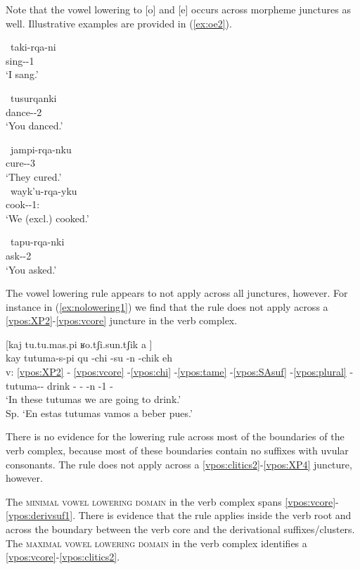 \documentclass[output=paper]{langscibook}
\begin{document}
Note that the vowel lowering to [o] and [e] occurs across morpheme junctures as well. Illustrative examples are provided in (\ref{ex:oe2}).

\ea \label{ex:oe2}
    \ea
    [ta.ker.ʁa.ni] \
    \gll taki-rqa-ni \\
    sing-\Pst{}-1\Sg{} \\
    \glt `I sang.'

     \
    \gll tusurqanki  \\
    dance-\Pst{}-2\Sg{} \\
    \glt `You danced.'
    
     \
    \gll jampi-rqa-nku \\
    cure-\Pst{}-3\Pl{} \\
    \glt `They cured.' \\
     \
    \gll wayk'u-rqa-yku \\
    cook-\Pst{}-1\Pl{}:\Excl{} \\
    \glt `We (excl.) cooked.'
    
    \ex
    [ta.por.ʁaŋ.ki] \
    \gll tapu-rqa-nki \\
    ask-\Pst{}-2\Sg{} \\
    \glt `You asked.'
\z 
\z 

The vowel lowering rule appears to not apply across all junctures, however. For instance in (\ref{ex:nolowering1}) we find that the rule does not apply across a \ref{vpos:XP2}-\ref{vpos:vcore} juncture in the verb complex. 

\ea \label{ex:nolowering1}
    [kaj tu.tu.mas.pi ʁo.tʃi.sun.tʃik a \downarrow]   \\ 
    \glll {} kay tutuma-s-pi qu -chi -su -n -chik eh \\
    v: \ref{vpos:XP2} - \ref{vpos:vcore} -\ref{vpos:chi} -\ref{vpos:tame} -\ref{vpos:SAsuf} -\ref{vpos:plural} - \\
    {} \Dem{} tutuma-\Pl{}-\Loc{} drink -\Caus{} -\Fut{} -n -1\Pl{} -    \\
    \glt `In these tutumas we are going to drink.' \\ Sp. `En estas tutumas vamos a beber pues.' 
\z 

There is no evidence for the lowering rule across most of the boundaries of the verb complex, because most of these boundaries contain no suffixes with uvular consonants. The rule does not apply across a \ref{vpos:clitics2}-\ref{vpos:XP4} juncture, however.

The \textsc{minimal vowel lowering domain} in the verb complex spans \ref{vpos:vcore}-\ref{vpos:derivsuf1}. There is evidence that the rule applies inside the verb root and across the boundary between the verb core and the derivational suffixes/clusters. The \textsc{maximal vowel lowering domain} in the verb complex identifies a \ref{vpos:vcore}-\ref{vpos:clitics2}. 
\end{document}
